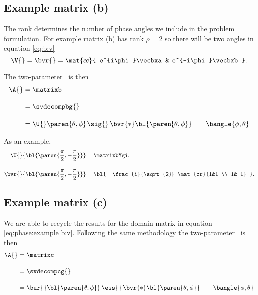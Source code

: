\subsection{Example matrix (b)}
The rank determines the number of phase angles we include in the problem formulation. For example matrix (b) has rank $\rho=2$ so there will be two angles in equation \eqref{eq:b:v}
\begin{equation}
  \V{} = \bvr{} = \mat{cc}{ e^{i\phi}\vecbxa &  e^{-i\phi}\vecbxb }.
  \label{eq:phase:example b:v}
\end{equation}

The two-parameter \asvd \ is then
\begin{equation}
  \begin{split}
    \A{} 
      &= \matrixb \\[10pt]
      &= \svdecompbg{} \\[10pt]  
      &= \U{} \paren{\theta,\phi} \, \sig{}\, \bvr{*}\bl{ \paren{\theta,\phi} } 
         \qquad \bangle{ \phi, \theta }
  \end{split}
\end{equation}

As an example, 
\begin{equation}
  \begin{split}
    \U{}  {\bl{ \paren{\frac{\pi}{2}, -\frac{\pi}{2}} }} &= \matrixbYgi, \\[10pt]
    \bvr{}{\bl{ \paren{\frac{\pi}{2}, -\frac{\pi}{2}} }} &= {\bl{ -\frac{i}{\sqrt{2}} \mat{cr}{1&1 \\ 1&-1} }} .
  \end{split}
\end{equation}

\subsection{Example matrix (c)}
We are able to recycle the results for the domain matrix in equation \eqref{eq:phase:example b:v}. Following the same methodology the two-parameter \asvd \ is then
\begin{equation}
  \begin{split}
    \A{} 
      &= \matrixc \\[10pt]
      &= \svdecompcg{} \\[10pt]  
      &= \bur{}\bl{ \paren{\theta,\phi} } \, \ess{}\, \bvr{*}\bl{ \paren{\theta,\phi} } 
         \qquad \bangle{ \phi, \theta }
  \end{split}
\end{equation}


\endinput